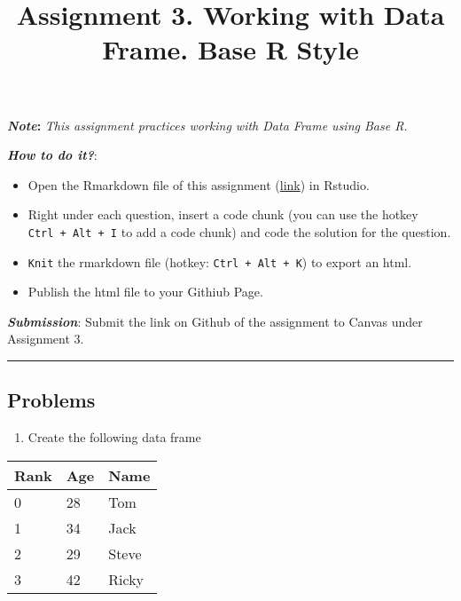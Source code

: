 \documentclass[
]{article}
\title{Assignment 3. Working with Data Frame. Base R Style}
\author{}
\date{\vspace{-2.5em}}
\providecommand{\tightlist}{%
  \setlength{\itemsep}{0pt}\setlength{\parskip}{0pt}}
\begin{document}
\maketitle

\textbf{\emph{Note}:} \emph{This assignment practices working with Data
Frame using Base R.}

\textbf{\emph{How to do it?}}:

\begin{itemize}
\item
  Open the Rmarkdown file of this assignment
  (\href{assignment3.Rmd}{link}) in Rstudio.
\item
  Right under each question, insert a code chunk (you can use the hotkey
  \texttt{Ctrl\ +\ Alt\ +\ I} to add a code chunk) and code the solution
  for the question.
\item
  \texttt{Knit} the rmarkdown file (hotkey: \texttt{Ctrl\ +\ Alt\ +\ K})
  to export an html.
\item
  Publish the html file to your Githiub Page.
\end{itemize}

\textbf{\emph{Submission}}: Submit the link on Github of the assignment
to Canvas under Assignment 3.

\begin{center}\rule{0.5\linewidth}{0.5pt}\end{center}

\hypertarget{problems}{%
\subsection{Problems}\label{problems}}

\hfill\break

\begin{enumerate}
\def\labelenumi{\arabic{enumi}.}
\tightlist
\item
  Create the following data frame
\end{enumerate}

\begin{longtable}[]{@{}lll@{}}
\toprule()
Rank & Age & Name \\
\midrule()
\endhead
0 & 28 & Tom \\
1 & 34 & Jack \\
2 & 29 & Steve \\
3 & 42 & Ricky \\
\bottomrule()
\end{longtable}
\end{document}
